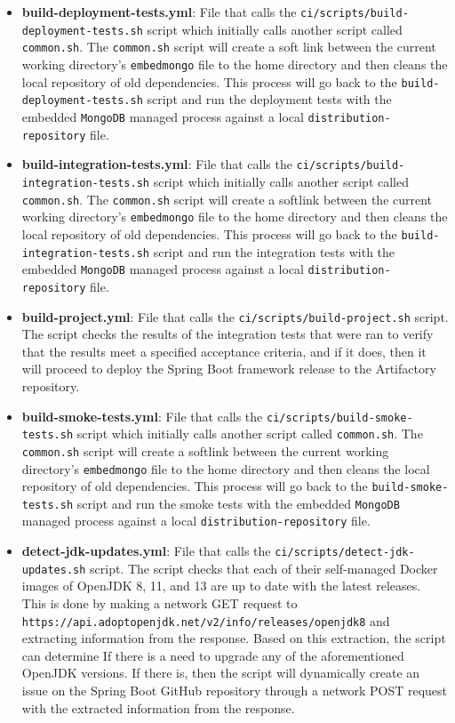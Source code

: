\begin{itemize}
\item \textbf{build-deployment-tests.yml}: File that calls the \texttt{ci/scripts/build-deployment-tests.sh} script which initially calls another script called \texttt{common.sh}. The \texttt{common.sh} script will create a soft link between the current working directory's \texttt{embedmongo} file to the home directory and then cleans the local repository of old dependencies. This process will go back to the \texttt{build-deployment-tests.sh} script and run the deployment tests with the embedded \texttt{MongoDB} managed process against a local \texttt{distribution-repository} file.
\item \textbf{build-integration-tests.yml}: File that calls the \texttt{ci/scripts/build-integration-tests.sh} script which initially calls another script called \texttt{common.sh}. The \texttt{common.sh} script will create a softlink between the current working directory's \texttt{embedmongo} file to the home directory and then cleans the local repository of old dependencies. This process will go back to the \texttt{build-integration-tests.sh} script and run the integration tests with the embedded \texttt{MongoDB} managed process against a local \texttt{distribution-repository} file.
\item \textbf{build-project.yml}: File that calls the \texttt{ci/scripts/build-project.sh} script. The script checks the results of the integration tests that were ran to verify that the results meet a specified acceptance criteria, and if it does, then it will proceed to deploy the Spring Boot framework release to the Artifactory repository.
\item \textbf{build-smoke-tests.yml}: File that calls the \texttt{ci/scripts/build-smoke-tests.sh} script which initially calls another script called \texttt{common.sh}. The \texttt{common.sh} script will create a softlink between the current working directory's \texttt{embedmongo} file to the home directory and then cleans the local repository of old dependencies. This process will go back to the \texttt{build-smoke-tests.sh} script and run the smoke tests with the embedded \texttt{MongoDB} managed process against a local \texttt{distribution-repository} file.
\item \textbf{detect-jdk-updates.yml}: File that calls the \texttt{ci/scripts/detect-jdk-updates.sh} script. The script checks that each of their self-managed Docker images of OpenJDK 8, 11, and 13 are up to date with the latest releases. This is done by making a network GET request to\\ \texttt{https://api.adoptopenjdk.net/v2/info/releases/openjdk8} and extracting information from the response. Based on this extraction, the script can determine If there is a need to upgrade any of the aforementioned OpenJDK versions. If there is, then the script will dynamically create an issue on the Spring Boot GitHub repository through a network POST request with the extracted information from the response.

\end{itemize}

